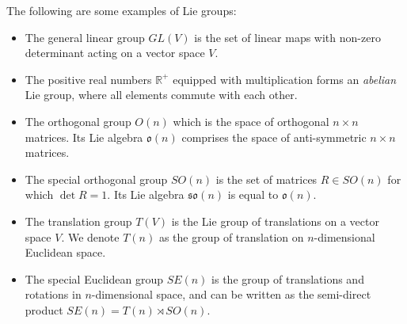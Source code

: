 The following are some examples of Lie groups:
\begin{itemize}
\item The general linear group $GL(V)$ is the set of linear maps with non-zero determinant acting on a vector space $V$.

\item The positive real numbers $\mathbb{R}^+$ equipped with multiplication forms an \textit{abelian} Lie group, where all elements commute with each other.

\item The orthogonal group $O(n)$ which is the space of orthogonal $n \times n$ matrices. Its Lie algebra $\mathfrak{o}(n)$ comprises the space of anti-symmetric $n \times n$ matrices.

\item The special orthogonal group $SO(n)$ is the set of matrices $R \in SO(n)$ for which $\det{R} = 1$. Its Lie algebra $\mathfrak{so}(n)$ is equal to $\mathfrak{o}(n)$.

\item The translation group $T(V)$ is the Lie group of translations on a vector space $V$. We denote $T(n)$ as the group of translation on $n$-dimensional Euclidean space.

\item The special Euclidean group $SE(n)$ is the group of translations and rotations in $n$-dimensional space, and can be written as the semi-direct product $SE(n) = T(n) \rtimes SO(n)$.
\end{itemize}



